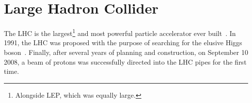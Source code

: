 
\section{Large Hadron Collider}
\label{sec:Chap2:LHC}
\begin{comment}
In the middle of the 80's, the plans for building the LHC were started.
At several high-energy physics workshops and conferences, the idea of assembling a machine able to 
reach multi-TeV energies was discussed. This instrument would allow physicists to search for the Higgs
boson at all possible masses. In 1991 the Long-Range Planning Committee of CERN proposed the
construction of the LHC as the best step forward in the future of CERN. The approval of
the LHC project arrived in 1994 and in 1995 the Conceptual Design Report was published~\cite{Pettersson:291782}. 
 on 10 September 2008, a beam of protons was successfully  directed into the LHC pipes for the first time.
\end{comment}

The LHC is the largest\footnote{Alongside LEP, which was equally large.} and most powerful 
particle accelerator ever built~\cite{Evans_2008}. %
In 1991, the LHC was proposed with the purpose of searching 
for the elusive Higgs boson~\cite{LHC_CernCouncil_Experiments, Pettersson:291782}. 
Finally, after several years of planning and construction, on September 10  2008, 
a beam of protons was successfully  directed into the LHC pipes for the first time.

